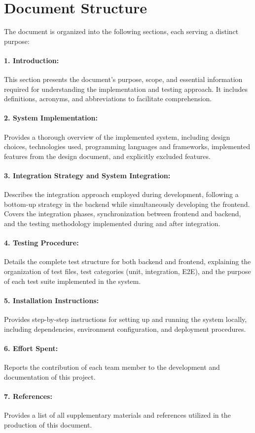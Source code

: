 \section{Document Structure}
\label{sec:document_structure}%
The document is organized into the following sections, each serving a distinct purpose:

\paragraph{1. Introduction:} This section presents the document's purpose, scope, and essential information required for understanding the implementation and testing approach. It includes definitions, acronyms, and abbreviations to facilitate comprehension.

\paragraph{2. System Implementation:} Provides a thorough overview of the implemented system, including design choices, technologies used, programming languages and frameworks, implemented features from the design document, and explicitly excluded features.

\paragraph{3. Integration Strategy and System Integration:} Describes the integration approach employed during development, following a bottom-up strategy in the backend while simultaneously developing the frontend. Covers the integration phases, synchronization between frontend and backend, and the testing methodology implemented during and after integration.

\paragraph{4. Testing Procedure:} Details the complete test structure for both backend and frontend, explaining the organization of test files, test categories (unit, integration, E2E), and the purpose of each test suite implemented in the system.

\paragraph{5. Installation Instructions:} Provides step-by-step instructions for setting up and running the system locally, including dependencies, environment configuration, and deployment procedures.

\paragraph{6. Effort Spent:} Reports the contribution of each team member to the development and documentation of this project.

\paragraph{7. References:} Provides a list of all supplementary materials and references utilized in the production of this document.
